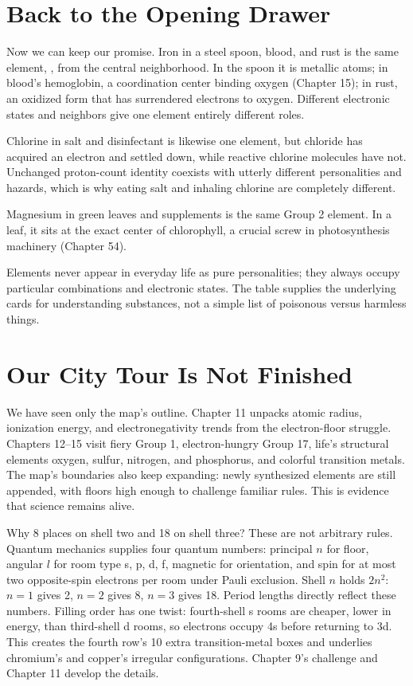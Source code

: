 \section{Back to the Opening Drawer}

Now we can keep our promise. Iron in a steel spoon, blood, and rust is the same element, , from the central neighborhood. In the spoon it is metallic atoms; in blood's hemoglobin, a coordination center binding oxygen (Chapter 15); in rust, an oxidized form that has surrendered electrons to oxygen. Different electronic states and neighbors give one element entirely different roles.

Chlorine in salt and disinfectant is likewise one element, but chloride  has acquired an electron and settled down, while reactive chlorine molecules  have not. Unchanged proton-count identity coexists with utterly different personalities and hazards, which is why eating salt and inhaling chlorine are completely different.

Magnesium in green leaves and supplements is the same Group 2 element. In a leaf, it sits at the exact center of chlorophyll, a crucial screw in photosynthesis machinery (Chapter 54).

Elements never appear in everyday life as pure personalities; they always occupy particular combinations and electronic states. The table supplies the underlying cards for understanding substances, not a simple list of poisonous versus harmless things.

\section{Our City Tour Is Not Finished}

We have seen only the map's outline. Chapter 11 unpacks atomic radius, ionization energy, and electronegativity trends from the electron-floor struggle. Chapters 12--15 visit fiery Group 1, electron-hungry Group 17, life's structural elements oxygen, sulfur, nitrogen, and phosphorus, and colorful transition metals. The map's boundaries also keep expanding: newly synthesized elements are still appended, with floors high enough to challenge familiar rules. This is evidence that science remains alive.

\begin{tiaozhan}
Why 8 places on shell two and 18 on shell three? These are not arbitrary rules. Quantum mechanics supplies four quantum numbers: principal $n$ for floor, angular $l$ for room type s, p, d, f, magnetic for orientation, and spin for at most two opposite-spin electrons per room under Pauli exclusion. Shell $n$ holds $2n^2$: $n=1$ gives 2, $n=2$ gives 8, $n=3$ gives 18. Period lengths directly reflect these numbers. Filling order has one twist: fourth-shell s rooms are cheaper, lower in energy, than third-shell d rooms, so electrons occupy 4s before returning to 3d. This creates the fourth row's 10 extra transition-metal boxes and underlies chromium's and copper's irregular configurations. Chapter 9's challenge and Chapter 11 develop the details.
\end{tiaozhan}

